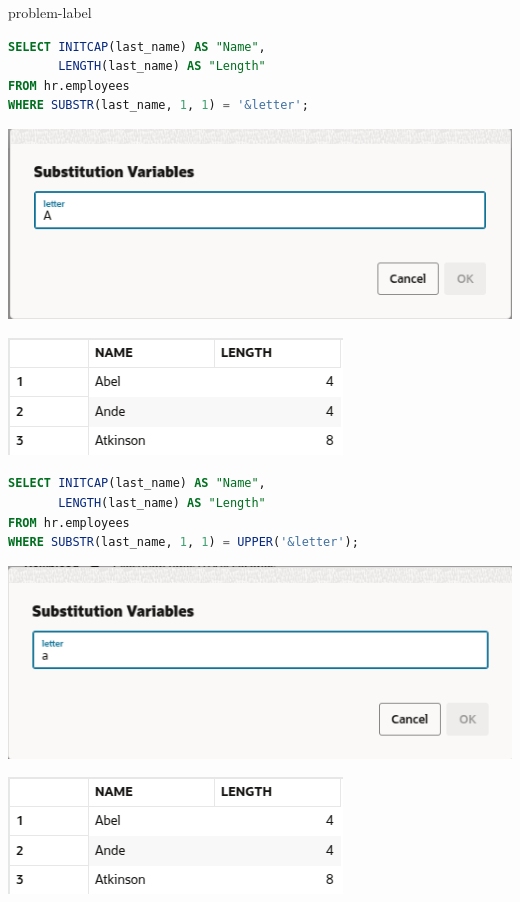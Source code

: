 \begin{problem}{}{problem-label}
\begin{lstlisting}[language=SQL]
SELECT INITCAP(last_name) AS "Name",
       LENGTH(last_name) AS "Length"
FROM hr.employees
WHERE SUBSTR(last_name, 1, 1) = '&letter';
\end{lstlisting}

\vspace{1em}

\begin{center}
  \includegraphics[scale=0.5]{images/c3a5-2.png}
\end{center}
\begin{center}
  \includegraphics[scale=0.8]{images/c3a5-3.png}
\end{center}

\begin{lstlisting}[language=SQL]
SELECT INITCAP(last_name) AS "Name",
       LENGTH(last_name) AS "Length"
FROM hr.employees
WHERE SUBSTR(last_name, 1, 1) = UPPER('&letter');
\end{lstlisting}

\vspace{1em}

\begin{center}
  \includegraphics[scale=0.5]{images/c3a5-4.png}
\end{center}

\begin{center}
  \includegraphics[scale=0.8]{images/c3a5-3.png}
\end{center}

\end{problem}

